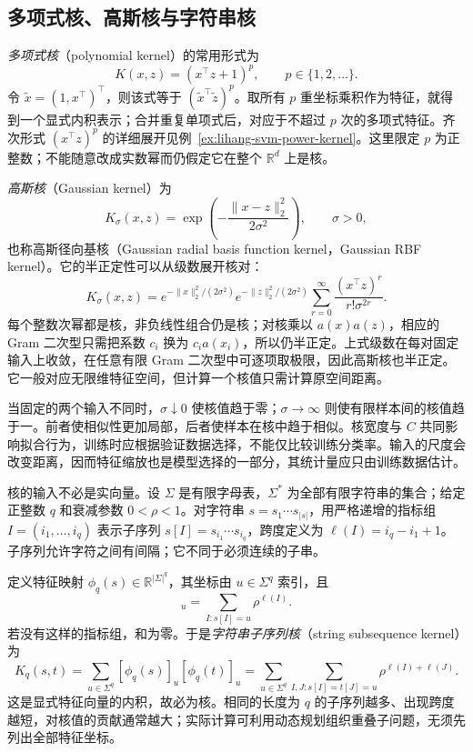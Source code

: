 \subsection{多项式核、高斯核与字符串核}

\emph{多项式核}（polynomial kernel）的常用形式为
\begin{equation}
  K(x,z)=(x^\top z+1)^p,
  \qquad p\in\{1,2,\ldots\}.
  \label{eq:lihang-svm-polynomial-kernel}
\end{equation}
令 $\widetilde x=(1,x^\top)^\top$，则该式等于 $(\widetilde x^\top\widetilde z)^p$。取所有 $p$ 重坐标乘积作为特征，就得到一个显式内积表示；合并重复单项式后，对应于不超过 $p$ 次的多项式特征。齐次形式 $(x^\top z)^p$ 的详细展开见例~\ref{ex:lihang-svm-power-kernel}。这里限定 $p$ 为正整数；不能随意改成实数幂而仍假定它在整个 $\mathbb R^d$ 上是核。

\emph{高斯核}（Gaussian kernel）为
\begin{equation}
  K_\sigma(x,z)=\exp\left(-\frac{\lVert x-z\rVert_2^2}{2\sigma^2}\right),
  \qquad \sigma>0,
  \label{eq:lihang-svm-gaussian-kernel}
\end{equation}
也称高斯径向基核（Gaussian radial basis function kernel，Gaussian RBF kernel）。它的半正定性可以从级数展开核对：
\[
  K_\sigma(x,z)
   =e^{-\lVert x\rVert_2^2/(2\sigma^2)}
    e^{-\lVert z\rVert_2^2/(2\sigma^2)}
      \sum_{r=0}^{\infty}\frac{(x^\top z)^r}{r!\sigma^{2r}}.
\]
每个整数次幂都是核，非负线性组合仍是核；对核乘以 $a(x)a(z)$，相应的 Gram 二次型只需把系数 $c_i$ 换为 $c_i a(x_i)$，所以仍半正定。上式级数在每对固定输入上收敛，在任意有限 Gram 二次型中可逐项取极限，因此高斯核也半正定。它一般对应无限维特征空间，但计算一个核值只需计算原空间距离。

当固定的两个输入不同时，$\sigma\downarrow0$ 使核值趋于零；$\sigma\to\infty$ 则使有限样本间的核值趋于一。前者使相似性更加局部，后者使样本在核中趋于相似。核宽度与 $C$ 共同影响拟合行为，训练时应根据验证数据选择，不能仅比较训练分类率。输入的尺度会改变距离，因而特征缩放也是模型选择的一部分，其统计量应只由训练数据估计。

核的输入不必是实向量。设 $\Sigma$ 是有限字母表，$\Sigma^*$ 为全部有限字符串的集合；给定正整数 $q$ 和衰减参数 $0<\rho<1$。对字符串 $s=s_1\cdots s_{|s|}$，用严格递增的指标组 $I=(i_1,\ldots,i_q)$ 表示子序列 $s[I]=s_{i_1}\cdots s_{i_q}$，跨度定义为 $\ell(I)=i_q-i_1+1$。子序列允许字符之间有间隔；它不同于必须连续的子串。

定义特征映射 $\phi_q(s)\in\mathbb R^{|\Sigma|^q}$，其坐标由 $u\in\Sigma^q$ 索引，且
\begin{equation}
  [\phi_q(s)]_u=\sum_{I:s[I]=u}\rho^{\ell(I)}.
  \label{eq:lihang-svm-string-feature}
\end{equation}
若没有这样的指标组，和为零。于是\emph{字符串子序列核}（string subsequence kernel）为
\begin{equation}
  K_q(s,t)=\sum_{u\in\Sigma^q}[\phi_q(s)]_u[\phi_q(t)]_u
    =\sum_{u\in\Sigma^q}\sum_{I,J:s[I]=t[J]=u}
           \rho^{\ell(I)+\ell(J)}.
  \label{eq:lihang-svm-string-kernel}
\end{equation}
这是显式特征向量的内积，故必为核。相同的长度为 $q$ 的子序列越多、出现跨度越短，对核值的贡献通常越大；实际计算可利用动态规划组织重叠子问题，无须先列出全部特征坐标。

